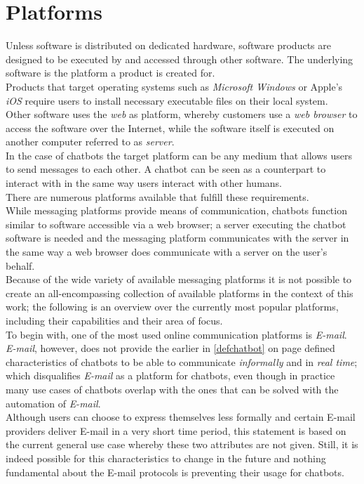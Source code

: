 \section{Platforms}
\label{platforms}

Unless software is distributed on dedicated hardware, software products are designed to be executed by and accessed through other software.
The underlying software is the platform a product is created for.
\\
Products that target operating systems such as \emph{Microsoft Windows} or Apple's \emph{iOS} require users to install necessary executable files on their local system.
\\
Other software uses the \emph{web} as platform, whereby customers use a \emph{web browser} to access the software over the Internet,
while the software itself is executed on another computer referred to as \emph{server}.
\\

In the case of chatbots the target platform can be any medium that allows users to send messages to each other.
A chatbot can be seen as a counterpart to interact with in the same way users interact with other humans.
\\

There are numerous platforms available that fulfill these requirements.
\\

While messaging platforms provide means of communication, chatbots function similar to software accessible via a web browser;
a server executing the chatbot software is needed and the messaging platform communicates with the server in the same way a web browser does communicate with a server on the user's behalf.
\\

Because of the wide variety of available messaging platforms it is not possible to create an all-encompassing collection of available platforms in the context of this work;
the following is an overview over the currently most popular platforms, including their capabilities and their area of focus.
\\

To begin with, one of the most used online communication platforms is \emph{E-mail}.
\\
\emph{E-mail}, however, does not provide the earlier in \ref{defchatbot} on page \pageref{defchatbot} defined characteristics of chatbots to be able to communicate \emph{informally} and in \emph{real time};
which disqualifies \emph{E-mail} as a platform for chatbots, even though in practice many use cases of chatbots overlap with the ones that can be solved with the automation of \emph{E-mail}.
\\
Although users can choose to express themselves less formally and certain E-mail providers deliver E-mail in a very short time period,
this statement is based on the current general use case whereby these two attributes are not given.
Still, it is indeed possible for this characteristics to change in the future
and nothing fundamental about the E-mail protocols is preventing their usage for chatbots.
\\

